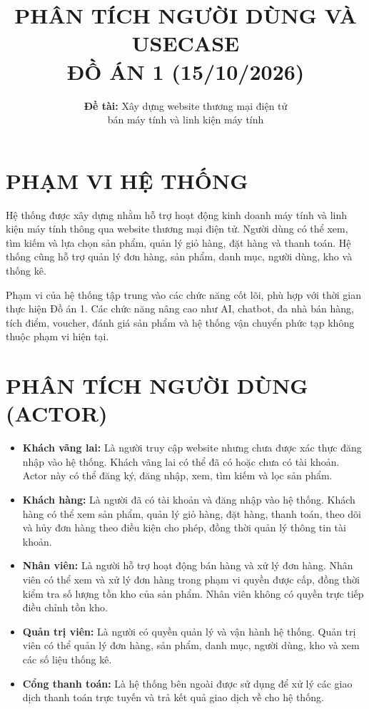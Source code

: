 \documentclass[12pt,a4paper]{article}
\title{\textbf{PHÂN TÍCH NGƯỜI DÙNG VÀ USECASE}\\
\Large ĐỒ ÁN 1 (15/10/2026)}
\author{\textbf{Đề tài:} Xây dựng website thương mại điện tử\\
bán máy tính và linh kiện máy tính}
\date{}
\begin{document}
\maketitle
\section{PHẠM VI HỆ THỐNG}

Hệ thống được xây dựng nhằm hỗ trợ hoạt động kinh doanh máy tính và linh kiện máy tính thông qua website thương mại điện tử. Người dùng có thể xem, tìm kiếm và lựa chọn sản phẩm, quản lý giỏ hàng, đặt hàng và thanh toán. Hệ thống cũng hỗ trợ quản lý đơn hàng, sản phẩm, danh mục, người dùng, kho và thống kê.

Phạm vi của hệ thống tập trung vào các chức năng cốt lõi, phù hợp với thời gian thực hiện Đồ án 1. Các chức năng nâng cao như AI, chatbot, đa nhà bán hàng, tích điểm, voucher, đánh giá sản phẩm và hệ thống vận chuyển phức tạp không thuộc phạm vi hiện tại.

\section{PHÂN TÍCH NGƯỜI DÙNG (ACTOR)}

\begin{itemize}

 \item \textbf{Khách vãng lai:} Là người truy cập website nhưng chưa được xác thực đăng nhập vào hệ thống. Khách vãng lai có thể đã có hoặc chưa có tài khoản. Actor này có thể đăng ký, đăng nhập, xem, tìm kiếm và lọc sản phẩm.

 \item \textbf{Khách hàng:} Là người đã có tài khoản và đăng nhập vào hệ thống. Khách hàng có thể xem sản phẩm, quản lý giỏ hàng, đặt hàng, thanh toán, theo dõi và hủy đơn hàng theo điều kiện cho phép, đồng thời quản lý thông tin tài khoản.

 \item \textbf{Nhân viên:} Là người hỗ trợ hoạt động bán hàng và xử lý đơn hàng. Nhân viên có thể xem và xử lý đơn hàng trong phạm vi quyền được cấp, đồng thời kiểm tra số lượng tồn kho của sản phẩm. Nhân viên không có quyền trực tiếp điều chỉnh tồn kho.

 \item \textbf{Quản trị viên:} Là người có quyền quản lý và vận hành hệ thống. Quản trị viên có thể quản lý đơn hàng, sản phẩm, danh mục, người dùng, kho và xem các số liệu thống kê.

 \item \textbf{Cổng thanh toán:} Là hệ thống bên ngoài được sử dụng để xử lý các giao dịch thanh toán trực tuyến và trả kết quả giao dịch về cho hệ thống.

\end{itemize}
\end{document}
